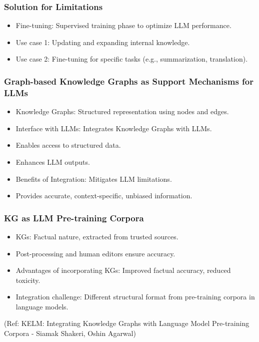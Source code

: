 \begin{frame}[fragile]\frametitle{Solution for Limitations}

\begin{itemize}
\item Fine-tuning: Supervised training phase to optimize LLM performance.
\item Use case 1: Updating and expanding internal knowledge.
\item Use case 2: Fine-tuning for specific tasks (e.g., summarization, translation).
\end{itemize}	

\end{frame}


\begin{frame}[fragile]\frametitle{Graph-based Knowledge Graphs as Support Mechanisms for LLMs}

\begin{itemize}
\item Knowledge Graphs: Structured representation using nodes and edges.
\item Interface with LLMs: Integrates Knowledge Graphs with LLMs.
\item Enables access to structured data.
\item Enhances LLM outputs.
\item Benefits of Integration: Mitigates LLM limitations.
\item Provides accurate, context-specific, unbiased information.
\end{itemize}	

\end{frame}


\begin{frame}[fragile]\frametitle{KG as LLM Pre-training Corpora}

\begin{itemize}
\item KGs: Factual nature, extracted from trusted sources.
\item Post-processing and human editors ensure accuracy.
\item Advantages of incorporating KGs: Improved factual accuracy, reduced toxicity.
\item Integration challenge: Different structural format from pre-training corpora in language models.
\end{itemize}	

{\tiny (Ref: KELM: Integrating Knowledge Graphs with Language Model Pre-training Corpora - Siamak Shakeri, Oshin Agarwal)}
\end{frame}


